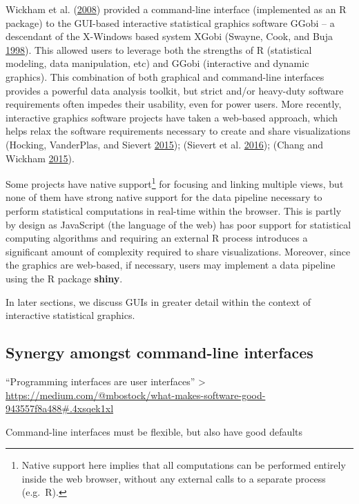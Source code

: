 \documentclass[12pt,]{isuthesis}
\let\rmarkdownfootnote\footnote%
\def\footnote{\protect\rmarkdownfootnote}
\begin{document}
Wickham et al. (\protect\hyperlink{ref-rggobi}{2008}) provided a
command-line interface (implemented as an R package) to the GUI-based
interactive statistical graphics software GGobi -- a descendant of the
X-Windows based system XGobi (Swayne, Cook, and Buja
\protect\hyperlink{ref-xgobi}{1998}). This allowed users to leverage
both the strengths of R (statistical modeling, data manipulation, etc)
and GGobi (interactive and dynamic graphics). This combination of both
graphical and command-line interfaces provides a powerful data analysis
toolkit, but strict and/or heavy-duty software requirements often
impedes their usability, even for power users. More recently,
interactive graphics software projects have taken a web-based approach,
which helps relax the software requirements necessary to create and
share visualizations (Hocking, VanderPlas, and Sievert
\protect\hyperlink{ref-animint}{2015}); (Sievert et al.
\protect\hyperlink{ref-plotly}{2016}); (Chang and Wickham
\protect\hyperlink{ref-ggvis}{2015}).

Some projects have native support\footnote{Native support here implies
  that all computations can be performed entirely inside the web
  browser, without any external calls to a separate process (e.g.~R).}
for focusing and linking multiple views, but none of them have strong
native support for the data pipeline necessary to perform statistical
computations in real-time within the browser. This is partly by design
as JavaScript (the language of the web) has poor support for statistical
computing algorithms and requiring an external R process introduces a
significant amount of complexity required to share visualizations.
Moreover, since the graphics are web-based, if necessary, users may
implement a data pipeline using the R package \textbf{shiny}.

In later sections, we discuss GUIs in greater detail within the context
of interactive statistical graphics.

\subsection{Synergy amongst command-line
interfaces}\label{synergy-amongst-command-line-interfaces}

``Programming interfaces are user interfaces'' \textgreater{}
\url{https://medium.com/@mbostock/what-makes-software-good-943557f8a488\#.4xsqek1xl}

Command-line interfaces must be flexible, but also have good defaults
\end{document}
